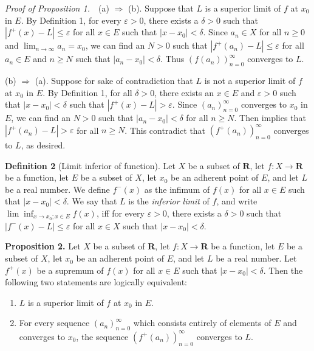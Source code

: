 \documentclass{book}
\newcommand{\titl}[1]{\noindent\textbf{#1}}
\begin{document}
\noindent\emph{Proof of Proposition 1.}~~(a) $\Rightarrow$ (b). Suppose that $L$ is a superior limit of $f$ at $x_0$ in $E$. By Definition 1, for every $\varepsilon>0$, there exists a $\delta>0$ such that $|f^+(x)-L|\leq\varepsilon$ for all $x\in E$ such that $|x-x_0|<\delta$. Since $a_n\in X$ for all $n\geq 0$ and $\lim_{n\to\infty}a_n=x_0$, we can find an $N>0$ such that $|f^+(a_n)-L|\leq\varepsilon$ for all $a_n\in E$ and $n\geq N$ such that $|a_n-x_0|<\delta$. Thus $(f(a_n))_{n=0}^{\infty}$ converges to $L$.

(b) $\Rightarrow$ (a). Suppose for sake of contradiction that $L$ is not a superior limit of $f$ at $x_0$ in $E$. By Definition 1, for all $\delta>0$, there exists an $x\in E$ and $\varepsilon>0$ such that $|x-x_0|<\delta$ such that $|f^+(x)-L|>\varepsilon$. Since $(a_n)_{n=0}^{\infty}$ converges to $x_0$ in $E$, we can find an $N>0$ such that $|a_n-x_0|<\delta$ for all $n\geq N$. Then implies that $|f^+(a_n)-L|>\varepsilon$ for all $n\geq N$. This contradict that $(f^+(a_n))_{n=0}^{\infty}$ converges to $L$, as desired.

\begin{framed}
\titl{Definition 2} (Limit inferior of function). Let $X$ be a subset of $\mathbf{R}$, let $f:X\to\mathbf{R}$ be a function, let $E$ be a subset of $X$, let $x_0$ be an adherent point of $E$, and let $L$ be a real number. We define $f^-(x)$ as the infimum of $f(x)$ for all $x\in E$ such that $|x-x_0|<\delta$. We say that $L$ is the \emph{inferior limit} of $f$, and write $\lim\inf_{x\to x_0;x\in E}f(x)$, iff for every $\varepsilon>0$, there exists a $\delta>0$ such that $|f^-(x)-L|\leq\varepsilon$ for all $x\in X$ such that $|x-x_0|<\delta$.
\end{framed}

\begin{framed}
\titl{Proposition 2.} Let $X$ be a subset of $\mathbf{R}$, let $f:X\to\mathbf{R}$ be a function, let $E$ be a subset of $X$, let $x_0$ be an adherent point of $E$, and let $L$ be a real number. Let $f^+(x)$ be a supremum of $f(x)$ for all $x\in E$ such that $|x-x_0|<\delta$. Then the following two statements are logically equivalent:
\begin{enumerate}
    \item $L$ is a superior limit of $f$ at $x_0$ in $E$.
    \item For every sequence $(a_n)_{n=0}^{\infty}$ which consists entirely of elements of $E$ and converges to $x_0$, the sequence $(f^+(a_n))_{n=0}^{\infty}$ converges to $L$.
\end{enumerate}
\end{framed}
\end{document}
